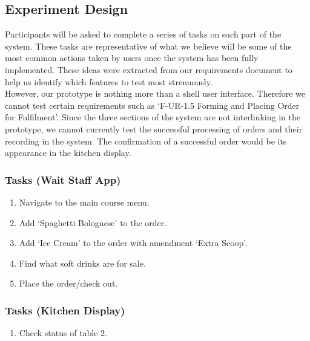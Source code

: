 \documentclass[11pt, a4paper]{report}
\begin{document}
\subsection{Experiment Design} 
Participants   will   be   asked   to   complete   a   series   of   tasks   on   each   part   of   the   system. These   tasks   are   representative   of   what   we   believe   will   be   some   of   the   most common   actions   taken   by   users   once   the   system   has   been   fully   implemented. These   ideas   were   extracted   from   our   requirements   document   to   help   us   identify which   features   to   test   most   strenuously.\\
However,   our   prototype   is   nothing   more   than   a   shell   user   interface.   Therefore   we cannot   test   certain   requirements   such   as   ‘F-UR-1.5   Forming   and   Placing   Order   for Fulfilment’.   Since   the   three   sections   of   the   system   are   not   interlinking   in   the prototype,   we   cannot   currently   test   the   successful   processing   of   orders   and   their recording   in   the   system.   The   confirmation   of   a   successful   order   would   be   its appearance   in   the   kitchen   display.


\subsubsection{Tasks (Wait Staff App)} 

\begin{enumerate} 
\item Navigate   to   the   main   course   menu.
\item Add   ‘Spaghetti   Bolognese’   to   the   order.
\item Add   ‘Ice   Cream’   to   the   order   with   amendment   ‘Extra   Scoop’.
\item Find   what   soft   drinks   are   for   sale.
\item Place   the   order/check   out.
\end{enumerate} 


\subsubsection{Tasks (Kitchen Display)} 

\begin{enumerate} 
\item Check   status   of   table   2.
\end{enumerate} 
\end{document}

